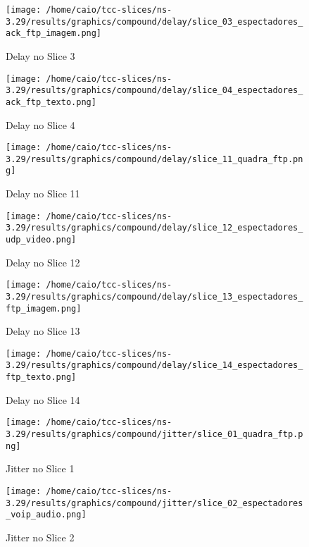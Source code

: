 \documentclass[11pt,twoside]{article}
\begin{document}
	\begin{figure}[H]
		\centering
		\texttt{[image: /home/caio/tcc-slices/ns-3.29/results/graphics/compound/delay/slice\_03\_espectadores\_ack\_ftp\_imagem.png]}
		\caption{Delay no Slice 3}
		\label{delay3}
	\end{figure}
	
	\begin{figure}[H]
		\centering
		\texttt{[image: /home/caio/tcc-slices/ns-3.29/results/graphics/compound/delay/slice\_04\_espectadores\_ack\_ftp\_texto.png]}
		\caption{Delay no Slice 4}
		\label{delay4}
	\end{figure}
	
	\begin{figure}[H]
		\centering
		\texttt{[image: /home/caio/tcc-slices/ns-3.29/results/graphics/compound/delay/slice\_11\_quadra\_ftp.png]}
		\caption{Delay no Slice 11}
		\label{delay11}
	\end{figure}
	
	\begin{figure}[H]
		\centering
		\texttt{[image: /home/caio/tcc-slices/ns-3.29/results/graphics/compound/delay/slice\_12\_espectadores\_udp\_video.png]}
		\caption{Delay no Slice 12}
		\label{delay12}
	\end{figure}
	
	\begin{figure}[H]
		\centering
		\texttt{[image: /home/caio/tcc-slices/ns-3.29/results/graphics/compound/delay/slice\_13\_espectadores\_ftp\_imagem.png]}
		\caption{Delay no Slice 13}
		\label{delay13}
	\end{figure}
	
	\begin{figure}[H]
		\centering
		\texttt{[image: /home/caio/tcc-slices/ns-3.29/results/graphics/compound/delay/slice\_14\_espectadores\_ftp\_texto.png]}
		\caption{Delay no Slice 14}
		\label{delay14}
	\end{figure}
	
	\begin{figure}[H]
		\centering
		\texttt{[image: /home/caio/tcc-slices/ns-3.29/results/graphics/compound/jitter/slice\_01\_quadra\_ftp.png]}
		\caption{Jitter no Slice 1}
		\label{jitter1}
	\end{figure}
	
	\begin{figure}[H]
		\centering
		\texttt{[image: /home/caio/tcc-slices/ns-3.29/results/graphics/compound/jitter/slice\_02\_espectadores\_voip\_audio.png]}
		\caption{Jitter no Slice 2}
		\label{jitter2}
	\end{figure}
	
\end{document}
